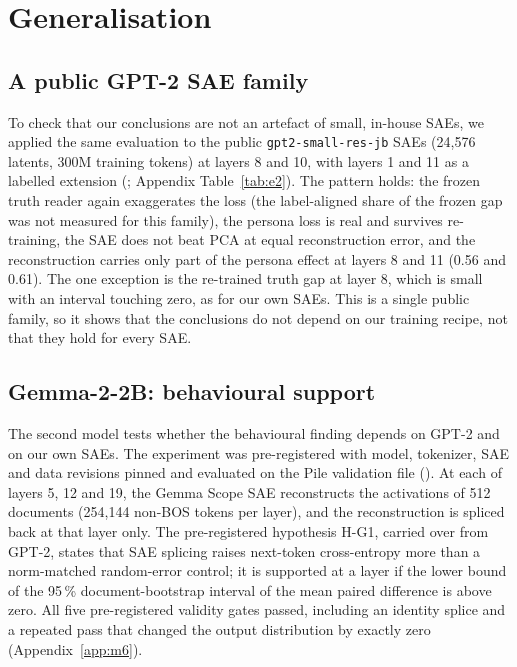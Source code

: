 \section{Generalisation}\label{sec:general}

\subsection{A public GPT-2 SAE family}\label{sec:e2}

To check that our conclusions are not an artefact of small, in-house SAEs, we applied the same evaluation to the public
\texttt{gpt2-small-res-jb} SAEs (24{,}576 latents, 300M training tokens) at layers 8 and 10, with layers 1 and 11 as a
labelled extension (; Appendix Table~\ref{tab:e2}). The pattern holds: the frozen truth reader
again exaggerates the loss (the label-aligned share of the frozen gap was not measured for this family), the persona
loss is real and survives re-training, the SAE does not beat PCA at equal
reconstruction error, and the reconstruction carries only part of the persona effect at layers 8 and 11 (0.56 and 0.61).
The one exception is the re-trained truth gap at layer 8, which is small with an interval touching zero, as for our own
SAEs. This is a single public family, so it shows that the conclusions do not depend on our training recipe, not that
they hold for every SAE.

\subsection{Gemma-2-2B: behavioural support}\label{sec:gemma}

The second model tests whether the behavioural finding depends on GPT-2 and on our own SAEs. The experiment was
pre-registered with model, tokenizer, SAE and data revisions pinned and evaluated on the Pile validation file
(). At each of layers 5, 12 and 19, the Gemma Scope SAE reconstructs the activations of 512
documents (254{,}144 non-BOS tokens per layer), and the reconstruction is spliced back at that layer only. The
pre-registered hypothesis H-G1, carried over from GPT-2, states that SAE splicing raises next-token cross-entropy more
than a norm-matched random-error control; it is supported at a layer if the lower bound of the 95\,\% document-bootstrap
interval of the mean paired difference is above zero. All five pre-registered validity gates passed, including an
identity splice and a repeated pass that changed the output distribution by exactly zero (Appendix~\ref{app:m6}).

